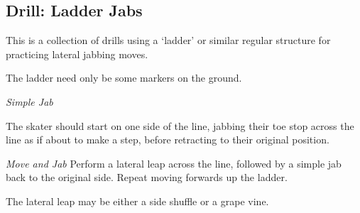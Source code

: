 \subsection*{Drill: Ladder Jabs}

This is a collection of drills using a `ladder' or similar regular structure for practicing lateral jabbing moves.

The ladder need only be some markers on the ground.


{\it Simple Jab}

The skater should start on one side of the line,  jabbing their toe stop across the line as if about to make a step, before retracting to their original position.



{\it Move and Jab}
Perform a lateral leap across the line, followed by a simple jab back to the original side. Repeat moving forwards up the ladder.

The lateral leap may be either a side shuffle or a grape vine.
